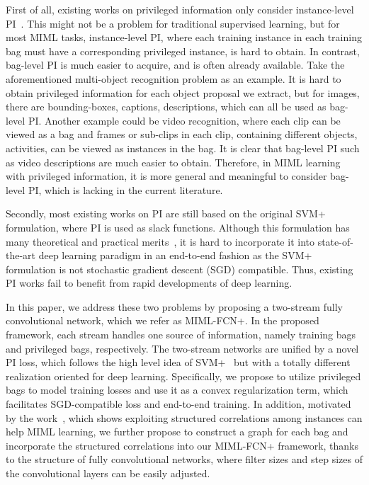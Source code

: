 \documentclass[10pt,twocolumn,letterpaper]{article}
\begin{document}
First of all, existing works on privileged information only
consider instance-level
PI~\cite{Vapnik2009,Vapnik2015a,Vapnik2015b,Li2014}. This might
not be a problem for traditional supervised learning, but for most
MIML tasks, instance-level PI, where each training instance in
each training bag must have a corresponding privileged instance,
is hard to obtain. In contrast, bag-level PI is much easier to
acquire, and is often already available. Take the aforementioned
multi-object recognition problem as an example. It is hard to
obtain privileged information for each object proposal we extract,
but for images, there are bounding-boxes, captions, descriptions,
which can all be used as bag-level PI. Another example could be
video recognition, where each clip can be viewed as a bag and
frames or sub-clips in each clip, containing different objects,
activities, can be viewed as instances in the bag. It is clear
that bag-level PI such as video descriptions are much easier to
obtain. Therefore, in MIML learning with privileged information,
it is more general and meaningful to consider bag-level PI, which
is lacking in the current literature.

Secondly, most existing works on PI are still based on the
original SVM+ formulation, where PI is used as slack functions.
Although this formulation has many theoretical and practical
merits~\cite{Vapnik2015a}, it is hard to incorporate it into
state-of-the-art deep learning paradigm in an end-to-end fashion
as the SVM+ formulation is not stochastic gradient descent (SGD)
compatible. Thus, existing PI works fail to benefit from rapid
developments of deep learning.

In this paper, we address these two problems by proposing a
two-stream fully convolutional network, which we refer as
\textsc{MIML-FCN+}. In the proposed framework, each stream handles
one source of information, namely training bags and privileged
bags, respectively. The two-stream networks are unified by a novel
PI loss, which follows the high level idea of
SVM+~\cite{Vapnik2009} but with a totally different realization
oriented for deep learning. Specifically, we propose to utilize
privileged bags to model training losses and use it as a convex
regularization term, which facilitates SGD-compatible loss and
end-to-end training. In addition, motivated by the
work~\cite{Zhou2009}, which shows exploiting structured
correlations among instances can help MIML learning, we further
propose to construct a graph for each bag and incorporate the
structured correlations into our MIML-FCN+ framework, thanks to
the structure of fully convolutional networks, where filter sizes
and step sizes of the convolutional layers can be easily adjusted.
\end{document}
